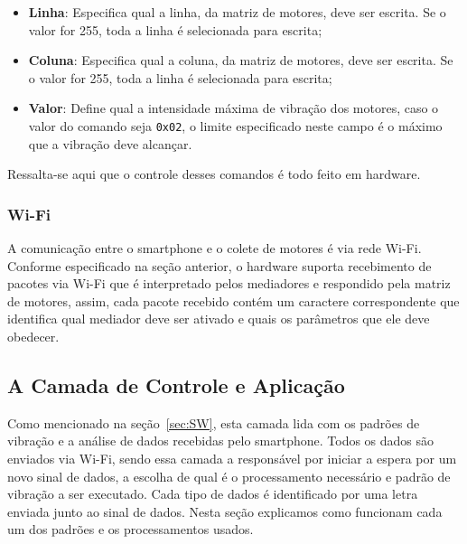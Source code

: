 \documentclass{sig-alternate-05-2015}
\begin{document}
\begin{itemize}
                \item \textbf{Linha}: Especifica qual a linha, da matriz de
                    motores, deve ser escrita. Se o valor for 255, toda a linha
                    é selecionada para escrita;
                
                \item \textbf{Coluna}: Especifica qual a coluna, da matriz de
                    motores, deve ser escrita. Se o valor for 255, toda a linha
                    é selecionada para escrita;
                
                \item \textbf{Valor}: Define qual a intensidade máxima de
                    vibração dos motores, caso o valor do comando seja
                    \texttt{0x02}, o limite especificado neste campo é o máximo
                    que a vibração deve alcançar.
                
            \end{itemize}
            Ressalta-se aqui que o controle desses comandos é todo feito em
            hardware.

        \subsubsection{Wi-Fi}
            A comunicação entre o smartphone e o colete de motores é via rede
            Wi-Fi. Conforme especificado na seção anterior, o hardware suporta
            recebimento de pacotes via Wi-Fi que é interpretado pelos
            mediadores e respondido pela matriz de motores, assim, cada pacote
            recebido contém um caractere correspondente que identifica qual
            mediador deve ser ativado e quais os parâmetros que ele deve
            obedecer.
            
    \subsection{A Camada de Controle e Aplicação}
        Como mencionado na seção~\ref{sec:SW}, esta camada lida com os padrões
        de vibração e a análise de dados recebidas pelo smartphone. Todos os
        dados são enviados via Wi-Fi, sendo essa camada a responsável por
        iniciar a espera por um novo sinal de dados, a escolha de qual é o
        processamento necessário e padrão de vibração a ser executado. Cada
        tipo de dados é identificado por uma letra enviada junto ao sinal de
        dados. Nesta seção explicamos como funcionam cada um dos padrões e os
        processamentos usados.
\end{document}
